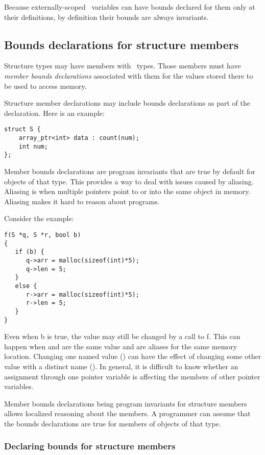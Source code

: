 Because externally-scoped \arrayptr\ variables can have bounds declared
for them only at their definitions, by definition their bounds are
always invariants.

\subsection{Bounds declarations for structure members}

Structure types may have members with \arrayptr\ types. Those
members must have \emph{member bounds declarations} associated with them for
the values stored there to be used to access memory.

Structure member declarations may include bounds declarations as part
of the declaration.  Here is an example:

\begin{lstlisting}
struct S {
    array_ptr<int> data : count(num);
    int num;
};
\end{lstlisting}


Member bounds declarations are program invariants that are true
by default for objects of that type.  This provides a way to deal with issues
caused by aliasing.  Aliasing is when multiple pointers point to or
into the same object in memory.  Aliasing makes it hard to reason about programs.

Consider the example:
\begin{lstlisting}
f(S *q, S *r, bool b)
{
   if (b) {
      q->arr = malloc(sizeof(int)*5);
      q->len = 5;
   }
   else {
      r->arr = malloc(sizeof(int)*5);
      r->len = 5;
   }
}
\end{lstlisting}

Even when b is true, the value  may still be
changed by a call to f. This can happen when  and 
are the same value and are aliases for the same memory location.
Changing one named value () can have the
effect of changing some other value with a distinct name
(). In general, it is difficult to know
whether an assignment through one pointer variable is affecting the
members of other pointer variables.

Member bounds declarations being program invariants for structure members allows
localized reasoning about the members. A programmer can assume that the
bounds declarations are true for members of objects of that type.

\subsubsection{Declaring bounds for structure members}

